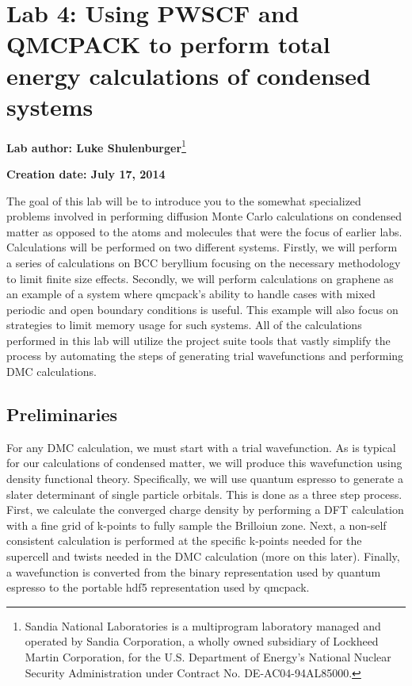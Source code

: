 \chapter{Lab 4: Using PWSCF and QMCPACK to perform total energy calculations of
condensed systems}

\begin{flushleft}
\textbf{Lab author: Luke Shulenburger}\footnote{Sandia National Laboratories is a multiprogram
laboratory managed and operated by Sandia Corporation, a wholly owned
subsidiary of Lockheed Martin Corporation, for the U.S. Department of Energy's
National Nuclear Security Administration under Contract No.
DE-AC04-94AL85000.}

\textbf{Creation date: July 17, 2014}
\end{flushleft}


The goal of this lab will be to introduce you to the somewhat specialized problems involved in performing diffusion Monte Carlo calculations on condensed matter as opposed to the atoms and molecules that were the focus of earlier labs.   Calculations will be performed on two different systems.  Firstly, we will perform a series of calculations on BCC beryllium focusing on the necessary methodology to limit finite size effects.  Secondly, we will perform calculations on graphene as an example of a system where qmcpack’s ability to handle cases with mixed periodic and open boundary conditions is useful.  This example will also focus on strategies to limit memory usage for such systems.
All of the calculations performed in this lab will utilize the project suite tools that vastly simplify the process by automating the steps of generating trial wavefunctions and performing DMC calculations.

\newcommand{\vp}{\mathbf{a}^\text{p}}
\newcommand{\vs}{\mathbf{a}^\text{s}} 
\newcommand{\Smat}{\mathbf{S}}
\section{Preliminaries}
For any DMC calculation, we must start with a trial wavefunction. As is typical for our calculations of condensed matter, we will produce this wavefunction using density functional theory.  Specifically, we will use quantum espresso to generate a slater determinant of single particle orbitals.  This is done as a three step process.  First, we calculate the converged charge density by performing a DFT calculation with a fine grid of k-points to fully sample the Brilloiun zone.  Next, a non-self consistent calculation is performed at the specific k-points needed for the supercell and twists needed in the DMC calculation (more on this later).  Finally, a wavefunction is converted from the binary representation used by quantum espresso to the portable hdf5 representation used by qmcpack.

